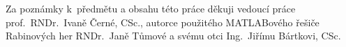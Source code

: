 Za poznámky k~předmětu a obsahu této práce děkuji vedoucí práce prof.~RNDr.~Ivaně Černé, CSc., autorce použitého MATLABového řešiče Rabinových her RNDr.~Janě Tůmové a svému otci Ing.~Jiřímu Bártkovi, CSc.